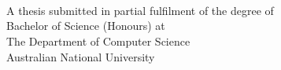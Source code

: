
\begin{titlepage}
  \enlargethispage{2cm}
  \begin{center}
    \makeatletter
    \Huge\textbf{\@title} \\[.4cm]
    \Huge\textbf{\thesisqualifier} \\[2.5cm]
    \huge\textbf{\@author} \\[8.5cm]
    \makeatother
    \Large A thesis submitted in partial fulfilment of the degree of \\
    \LARGE Bachelor of Science (Honours) at \\
    The Department of Computer Science\\
    Australian National University \\[2cm]
    \thismonth
  \end{center}
\end{titlepage}

